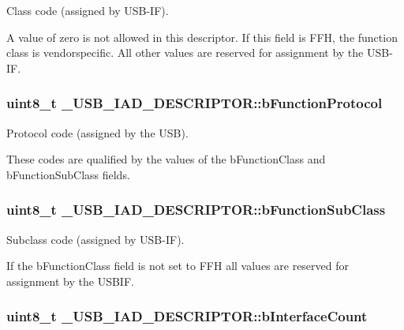 Class code (assigned by U\-S\-B-\/\-I\-F). \par
A value of zero is not allowed in this descriptor. If this field is F\-F\-H, the function class is vendorspecific. All other values are reserved for assignment by the U\-S\-B-\/\-I\-F. \hypertarget{struct__USB__IAD__DESCRIPTOR_ab0aa68806b463f0ce4ffdcfb5c1bbba4}{
\subsubsection[{b\-Function\-Protocol}]{\setlength{\rightskip}{0pt plus 5cm}uint8\-\_\-t \-\_\-\-U\-S\-B\-\_\-\-I\-A\-D\-\_\-\-D\-E\-S\-C\-R\-I\-P\-T\-O\-R\-::b\-Function\-Protocol}}\label{struct__USB__IAD__DESCRIPTOR_ab0aa68806b463f0ce4ffdcfb5c1bbba4}
Protocol code (assigned by the U\-S\-B). \par
These codes are qualified by the values of the b\-Function\-Class and b\-Function\-Sub\-Class fields. \hypertarget{struct__USB__IAD__DESCRIPTOR_ace36407d116b50a76320813cd2174a8c}{
\subsubsection[{b\-Function\-Sub\-Class}]{\setlength{\rightskip}{0pt plus 5cm}uint8\-\_\-t \-\_\-\-U\-S\-B\-\_\-\-I\-A\-D\-\_\-\-D\-E\-S\-C\-R\-I\-P\-T\-O\-R\-::b\-Function\-Sub\-Class}}\label{struct__USB__IAD__DESCRIPTOR_ace36407d116b50a76320813cd2174a8c}
Subclass code (assigned by U\-S\-B-\/\-I\-F). \par
If the b\-Function\-Class field is not set to F\-F\-H all values are reserved for assignment by the U\-S\-B\-I\-F. \hypertarget{struct__USB__IAD__DESCRIPTOR_adbaa947d670f827e1c063614daa792fe}{
\subsubsection[{b\-Interface\-Count}]{\setlength{\rightskip}{0pt plus 5cm}uint8\-\_\-t \-\_\-\-U\-S\-B\-\_\-\-I\-A\-D\-\_\-\-D\-E\-S\-C\-R\-I\-P\-T\-O\-R\-::b\-Interface\-Count}}\label{struct__USB__IAD__DESCRIPTOR_adbaa947d670f827e1c063614daa792fe}
